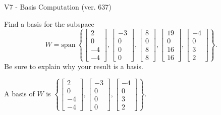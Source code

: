 \begin{exercise}
  \begin{exerciseTitle}V7 - Basis Computation (ver. 637)\end{exerciseTitle}
  \begin{exerciseStatement}
    Find a basis for the subspace 
\[W=\mathrm{span}\ \left\{\left[\begin{array}{r}
2 \\
0 \\
-4 \\
-4
\end{array}\right] , \left[\begin{array}{r}
-3 \\
0 \\
0 \\
0
\end{array}\right] , \left[\begin{array}{r}
8 \\
0 \\
8 \\
8
\end{array}\right] , \left[\begin{array}{r}
19 \\
0 \\
16 \\
16
\end{array}\right] , \left[\begin{array}{r}
-4 \\
0 \\
3 \\
2
\end{array}\right]\right\}.\]
 Be sure to explain why your result is a basis.


  \end{exerciseStatement}
  \begin{exerciseAnswer}
   A basis of \(W\) is  \(\left\{\left[\begin{array}{r}
2 \\
0 \\
-4 \\
-4
\end{array}\right] , \left[\begin{array}{r}
-3 \\
0 \\
0 \\
0
\end{array}\right] , \left[\begin{array}{r}
-4 \\
0 \\
3 \\
2
\end{array}\right]\right\}\).
  


  \end{exerciseAnswer}
\end{exercise}